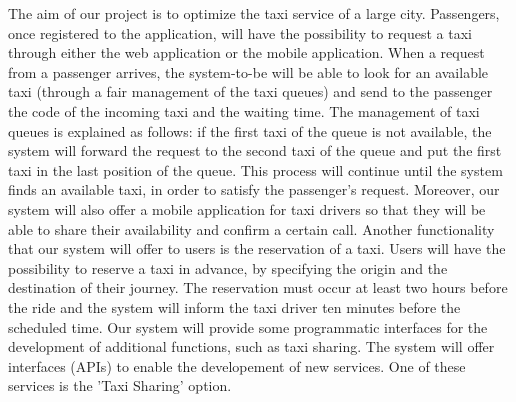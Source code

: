 The aim of our project is to optimize the taxi service of a large city. 
Passengers, once registered to the application, will have the possibility to request a taxi through either the web application or the mobile application. When a request from a passenger arrives, the system-to-be will be able to look for an available taxi (through a fair management of the taxi queues) and send to the passenger the code of the incoming taxi and the waiting time. 
\newline
The management of taxi queues is explained as follows: if the first taxi of the queue is not available, the system will forward the request to the second taxi of the queue and put the first taxi in the last position of the queue. This process will continue until the system finds an available taxi, in order to satisfy the passenger's request.
\newline
Moreover, our system will also offer a mobile application for taxi drivers so that they will be able to share their availability and confirm a certain call.
\newline
Another functionality that our system will offer to users is the reservation of a taxi. Users will have the possibility to reserve a taxi in advance, by specifying the origin and the destination of their journey. The reservation must occur at least two hours before the ride and the system will inform the taxi driver ten minutes before the scheduled time.
\newline
Our system will provide some programmatic interfaces for the development of additional functions, such as taxi sharing.
\newline
The system will offer interfaces (APIs) to enable the developement of new services.
One of these services is the 'Taxi Sharing' option.